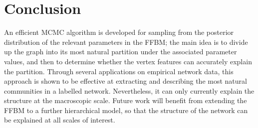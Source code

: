 \section{Conclusion}
\label{sec:conclusion}


An efficient MCMC algorithm 
is developed for sampling 
from the posterior distribution of
the relevant parameters in the FFBM;
the main idea is to divide up the graph into 
its most natural partition under the associated
parameter values, and then to determine whether 
the vertex features can accurately explain the partition. 
Through several applications on empirical
network data, this approach 
is shown to be effective at extracting and describing 
the most natural communities in a labelled network. 
Nevertheless, it
can only currently explain the structure at the macroscopic
scale. Future work will benefit from extending 
the FFBM to a further hierarchical model,
so that
the structure of the network 
can be explained at all scales of interest.



